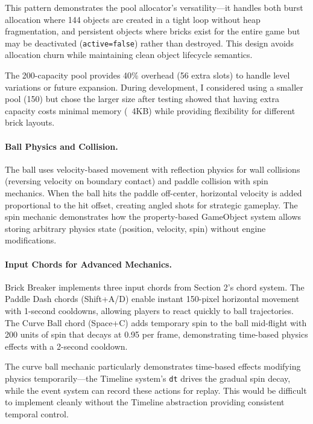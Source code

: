 \documentclass[12pt]{article}
\begin{document}
This pattern demonstrates the pool allocator's versatility—it handles both burst allocation where 144 objects are created in a tight loop without heap fragmentation, and persistent objects where bricks exist for the entire game but may be deactivated (\texttt{active=false}) rather than destroyed. This design avoids allocation churn while maintaining clean object lifecycle semantics.

The 200-capacity pool provides 40\% overhead (56 extra slots) to handle level variations or future expansion. During development, I considered using a smaller pool (150) but chose the larger size after testing showed that having extra capacity costs minimal memory (~4KB) while providing flexibility for different brick layouts.

\paragraph{Ball Physics and Collision.}
The ball uses velocity-based movement with reflection physics for wall collisions (reversing velocity on boundary contact) and paddle collision with spin mechanics. When the ball hits the paddle off-center, horizontal velocity is added proportional to the hit offset, creating angled shots for strategic gameplay. The spin mechanic demonstrates how the property-based GameObject system allows storing arbitrary physics state (position, velocity, spin) without engine modifications.

\paragraph{Input Chords for Advanced Mechanics.}
Brick Breaker implements three input chords from Section 2's chord system. The Paddle Dash chords (Shift+A/D) enable instant 150-pixel horizontal movement with 1-second cooldowns, allowing players to react quickly to ball trajectories. The Curve Ball chord (Space+C) adds temporary spin to the ball mid-flight with 200 units of spin that decays at 0.95 per frame, demonstrating time-based physics effects with a 2-second cooldown.

The curve ball mechanic particularly demonstrates time-based effects modifying physics temporarily—the Timeline system's \texttt{dt} drives the gradual spin decay, while the event system can record these actions for replay. This would be difficult to implement cleanly without the Timeline abstraction providing consistent temporal control.

\end{document}
